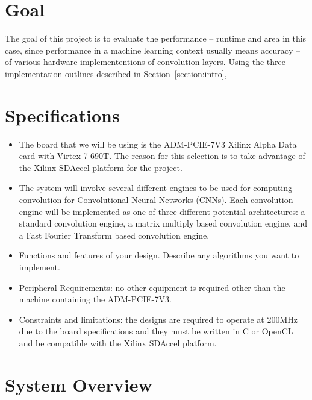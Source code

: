 \documentclass[conference,compsoc]{IEEEtran/IEEEtran}
\begin{document}
\section{Goal}\label{section:goal}

The goal of this project is to evaluate the performance -- runtime and area in this case, since performance in a machine learning context usually means accuracy -- of various hardware implemententions of convolution layers.
Using the three implementation outlines described in Section~\ref{section:intro}, 

\section{Specifications}\label{section:spec}
\begin{itemize}
\item The board that we will be using is the ADM-PCIE-7V3 Xilinx Alpha Data card
with Virtex-7 690T. The reason for this selection is to take advantage of the
Xilinx SDAccel platform for the project.

\item The system will involve several different engines to be used for computing
convolution for Convolutional Neural Networks (CNNs). Each convolution engine
will be implemented as one of three different potential architectures: a standard
convolution engine, a matrix multiply based convolution engine, and a Fast Fourier
Transform based convolution engine.

\item Functions and features of your design.
Describe any algorithms you want to implement.


\item Peripheral Requirements: no other equipment is required other than the machine
containing the ADM-PCIE-7V3.
\item Constraints and limitations: the designs are required to operate at 200MHz due
to the board specifications and they must be written in C or OpenCL and be compatible
with the Xilinx SDAccel platform.
\end{itemize}

\section{System Overview}\label{section:overview}
\end{document}
